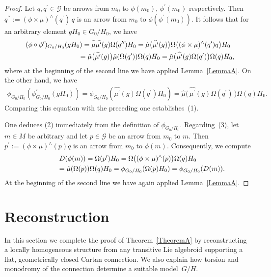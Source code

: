 \documentclass[11pt]{article}
\numberwithin{equation}{section}
\begin{document}
\begin{proof}
  Let $q,q^\prime \in {\mathcal G} $ be arrows from $m_0$ to
  $\phi(m_0)$, $\phi^\prime(m_0)$ respectively. Then
  $q^{\prime\prime}:=(\phi \times \mu)^\wedge(q^\prime)\,q$ is an
  arrow from $m_0$ to $\phi(\phi^\prime(m_0))$. It follows that for an
  arbitrary element $gH_0\in {G_0/H_0}$, we have
  \begin{gather*}
    (\phi \circ  \phi^\prime)_{G_0/H_0}(gH_0)=\widehat{\mu \mu^\prime}(g)\Omega(q^{\prime\prime})H_0=\hat\mu\big(\widehat{\mu^\prime}(g)\big)\Omega\big( (\phi \times \mu)^\wedge(q^\prime)q \big)H_0\\
    \hphantom{(\phi \circ  \phi^\prime)_{G_0/H_0}(gH_0)}{}
=\hat\mu\big(\widehat{\mu^\prime}(g)\big)\hat\mu(\Omega(q^\prime))\Omega(q)H_0=
\hat\mu \big( \widehat{\mu^\prime}(g)\Omega(q^\prime) \big)\Omega(q)H_0,
  \end{gather*}
  where at the beginning of the second line we have applied Lemma~\ref{LemmaA}. On the other hand, we have
  \begin{gather*}
    \phi_{G_0/H_0}(\phi^\prime_{G_0/H_0}(gH_0))=
     \phi_{G_0/H_0}(\widehat{\mu^\prime}(g)\Omega(q^\prime)H_0)=\hat\mu \Big(\,\widehat{\mu^\prime}(g)\Omega(q^\prime)\,\Big)\Omega(q)H_0.
   \end{gather*}
   Comparing this equation with the preceding one establishes~(1).

   One deduces (2) %
   immediately from the def\/inition of
   $\phi_{G_0/H_0} $. Regarding~(3), %
   let $m \in M$ be
   arbitrary and let $p \in {\mathcal G} $ be an arrow from $m_0$ to
   $m$. Then $p^\prime := (\phi \times \mu)^\wedge(p) q$ is an arrow
   from $m_0$ to $\phi(m)$. Consequently, we compute
\begin{gather*}
  D(\phi(m))=\Omega(p^\prime)H_0=\Omega \big( (\phi \times
  \mu)^\wedge(p) \big)\Omega(q)H_0\\
\hphantom{D(\phi(m))}{}  =\hat\mu(\Omega(p))\Omega(q)H_0
  =\phi_{G_0/H_0}(\Omega(p)H_0)=\phi_{G_0/H_0}(D(m)).
\end{gather*}
At the beginning of the second line we have again applied Lemma~\ref{LemmaA}.
\end{proof}

\section{Reconstruction}\label{main}

In this section we complete the proof of Theorem~\ref{TheoremA} by reconstructing a
locally homogeneous structure from any transitive Lie algebroid
supporting a f\/lat, geometrically closed Cartan connection. We also
explain how torsion and monodromy of the connection determine a
suitable model~$G/H$.
\end{document}
